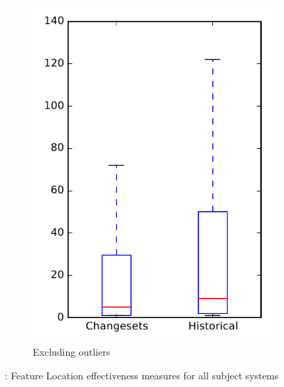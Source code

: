 \begin{figure}
\begin{subfigure}{.4\textwidth}
        \includegraphics[height=0.4\textheight]{figures/flt/rq2_overview_no_outlier}
        \caption{Excluding outliers}\label{fig:flt:rq2:overview_no_outlier}
    \end{subfigure}
\caption{\ftwo: Feature Location effectiveness measures for all subject systems}
\label{fig:flt:rq2:overview}
\end{figure}
